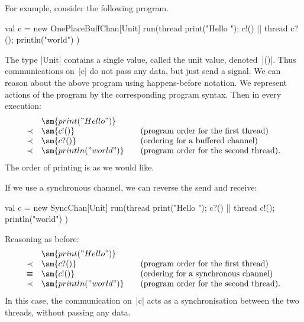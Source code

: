 For example, consider the following program.
\begin{scala}
  val c = new OnePlaceBuffChan[Unit]
  run(thread{ print("Hello "); c!() } || thread{ c?(); println("world") })
\end{scala}
%
The type |Unit| contains a single value, called the unit value, denoted~|()|.
Thus communications on~|c| do not pass any data, but just send a signal.
%
We can reason about the above program using happens-before notation.  We
represent actions of the program by the corresponding program syntax.  Then in
every execution:
\[
\begin{array}{cl@{\qquad}l}
& \sm{print("Hello ")} \\
\prec & \sm{c!()} & \mbox{(program order for the first thread)} \\
\prec & \sm{c?()} & \mbox{(ordering for a buffered channel)} \\
\prec & \sm{println("world")} & \mbox{(program order for the second thread).}
\end{array}
\]
The order of printing is as we would like. 

If we use a synchronous channel, we can reverse the send and receive:
%
\begin{scala}
  val c = new SyncChan[Unit]
  run(thread{ print("Hello "); c?() } || thread{ c!(); println("world") })
\end{scala}
%
Reasoning as before:
\[
\begin{array}{cl@{\qquad}l}
& \sm{print("Hello ")} \\
\prec & \sm{c?()} & \mbox{(program order for the first thread)} \\
\equiv & \sm{c!()} & \mbox{(ordering for a synchronous channel)} \\
\prec & \sm{println("world")} & \mbox{(program order for the second thread).}
\end{array}
\]
In this case, the communication on~|c| acts as a synchronisation between the
two threads, without passing any data.

